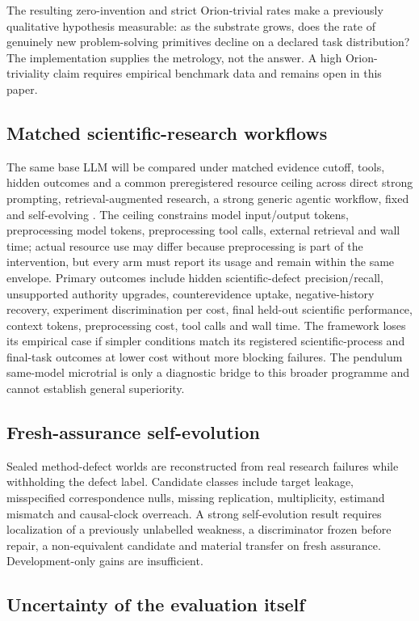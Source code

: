 The resulting zero-invention and strict Orion-trivial rates make a previously qualitative hypothesis measurable: as the substrate grows, does the rate of genuinely new problem-solving primitives decline on a declared task distribution? The implementation supplies the metrology, not the answer. A high Orion-triviality claim requires empirical benchmark data and remains open in this paper.
\subsection{Matched scientific-research workflows}
The same base LLM will be compared under matched evidence cutoff, tools, hidden outcomes and a common preregistered resource ceiling across direct strong prompting, retrieval-augmented research, a strong generic agentic workflow, fixed \RAKL{} and self-evolving \RAKL{}. The ceiling constrains model input/output tokens, preprocessing model tokens, preprocessing tool calls, external retrieval and wall time; actual resource use may differ because preprocessing is part of the intervention, but every arm must report its usage and remain within the same envelope. Primary outcomes include hidden scientific-defect precision/recall, unsupported authority upgrades, counterevidence uptake, negative-history recovery, experiment discrimination per cost, final held-out scientific performance, context tokens, preprocessing cost, tool calls and wall time. The framework loses its empirical case if simpler conditions match its registered scientific-process and final-task outcomes at lower cost without more blocking failures. The pendulum same-model microtrial is only a diagnostic bridge to this broader programme and cannot establish general superiority.

\subsection{Fresh-assurance self-evolution}
Sealed method-defect worlds are reconstructed from real research failures while withholding the defect label. Candidate classes include target leakage, misspecified correspondence nulls, missing replication, multiplicity, estimand mismatch and causal-clock overreach. A strong self-evolution result requires localization of a previously unlabelled weakness, a discriminator frozen before repair, a non-equivalent candidate and material transfer on fresh assurance. Development-only gains are insufficient.

\subsection{Uncertainty of the evaluation itself}

